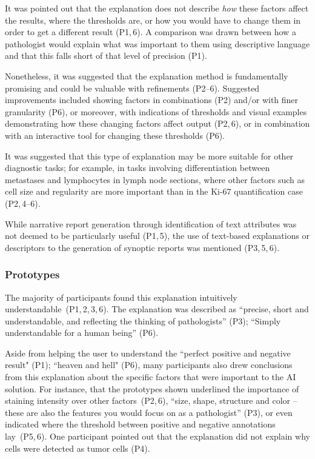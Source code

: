 \documentclass[final,5p,times,twocolumn,hyphens]{elsarticle}
\begin{document}
It was pointed out that the explanation does not describe \textit{how} these factors affect the results, where the thresholds are, or how you would have to change them in order to get a different result (P1,\,6). A comparison was drawn between how a pathologist would explain what was important to them using descriptive language and that this falls short of that level of precision (P1).

Nonetheless, it was suggested that the explanation method is fundamentally promising and could be valuable with refinements (P2--6). Suggested improvements included showing factors in combinations (P2) and/or with finer granularity (P6), or moreover, with indications of thresholds and visual examples demonstrating how these changing factors affect output (P2,\,6), or in combination with an interactive tool for changing these thresholds (P6). 

It was suggested that this type of explanation may be more suitable for other diagnostic tasks; for example, in tasks involving differentiation between metastases and lymphocytes in lymph node sections, where other factors such as cell size and regularity are more important than in the Ki-67 quantification case (P2,\,4--6).

While narrative report generation through identification of text attributes was not deemed to be particularly useful (P1,\,5), the use of text-based explanations or descriptors to the generation of synoptic reports was mentioned (P3,\,5,\,6). 

\subsubsection{Prototypes}

The majority of participants found this explanation intuitively understandable~(P1,\,2,\,3,\,6). The explanation was described as “precise, short and understandable, and reflecting the thinking of pathologists” (P3); “Simply understandable for a human being” (P6).


Aside from helping the user to understand the ``perfect positive and negative result" (P1); ``heaven and hell" (P6), many participants also drew conclusions from this explanation about the specific factors that were important to the AI solution. For instance, that the prototypes shown underlined the importance of staining intensity over other factors~(P2,\,6), ``size, shape, structure and color -- these are also the features you would focus on as a pathologist” (P3), or even indicated where the threshold between positive and negative annotations lay~(P5,\,6). One participant pointed out that the explanation did not explain why cells were detected as tumor cells (P4).
\end{document}
